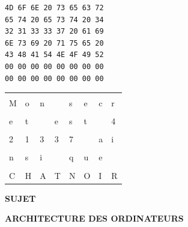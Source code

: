 \documentclass[11pt,a4paper]{article}
\newcommand{\TitreMatiere}{Architecture des Ordinateurs}
\begin{document}
\begin{table}[ht!]
  \centering
  \begin{minipage}{0.4\textwidth}
    \centering
\begin{lstlisting}[style=algorithmique]
4D 6F 6E 20 73 65 63 72
65 74 20 65 73 74 20 34
32 31 33 33 37 20 61 69
6E 73 69 20 71 75 65 20
43 48 41 54 4E 4F 49 52
00 00 00 00 00 00 00 00
00 00 00 00 00 00 00 00
\end{lstlisting}
  \end{minipage}
  \hfillx
  \begin{minipage}{0.45\textwidth}
    \centering

%
%
%
%
%
%
%

\begin{tabular}{ | m{0.45cm} | m{0.45cm} | m{0.45cm} | m{0.45cm}   |   m{0.45cm} | m{0.45cm} | m{0.45cm} | m{0.45cm} | }
\hline
   &   &   &   &   &   &   &   \\
 M & o & n &   & s & e & c & r \\
\hline
   &   &   &   &   &   &   &   \\
 e & t &   & e & s & t &   & 4 \\
\hline
   &   &   &   &   &   &   &   \\
 2 & 1 & 3 & 3 & 7 &   & a & i \\
\hline
   &   &   &   &   &   &   &   \\
 n & s & i &   & q & u & e &   \\
\hline
   & \cellcolor{black!15}   & \cellcolor{black!15}   & \cellcolor{black!15}   & \cellcolor{black!15}   & \cellcolor{black!15}   & \cellcolor{black!15}   & \cellcolor{black!15}   \\
 C & \cellcolor{black!15} H & \cellcolor{black!15} A & \cellcolor{black!15} T & \cellcolor{black!15} N & \cellcolor{black!15} O & \cellcolor{black!15} I & \cellcolor{black!15} R \\
\hline
\end{tabular}

  \end{minipage}
\end{table}



%
%

\newpage



\vfillFirst

\begin{center}

\begin{LARGE}
\textbf{SUJET}

\bigskip

\textbf{\MakeUppercase{\TitreMatiere}}
\end{LARGE}

\end{center}

\vfillLast
\end{document}
